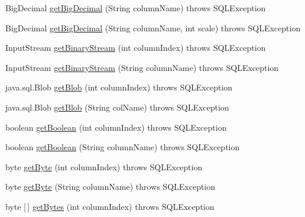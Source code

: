 \begin{DoxyCompactItemize}
\item 
Big\+Decimal \mbox{\hyperlink{classcom_1_1mysql_1_1cj_1_1jdbc_1_1result_1_1_result_set_impl_a046a2a4a9b467347eb74d6f22570672a}{get\+Big\+Decimal}} (String column\+Name)  throws S\+Q\+L\+Exception 
\item 
Big\+Decimal \mbox{\hyperlink{classcom_1_1mysql_1_1cj_1_1jdbc_1_1result_1_1_result_set_impl_aa3efee2955eda3fcaf80857db8f49807}{get\+Big\+Decimal}} (String column\+Name, int scale)  throws S\+Q\+L\+Exception 
\item 
Input\+Stream \mbox{\hyperlink{classcom_1_1mysql_1_1cj_1_1jdbc_1_1result_1_1_result_set_impl_a06c0080b1cef002f50342fd6e37c57a9}{get\+Binary\+Stream}} (int column\+Index)  throws S\+Q\+L\+Exception 
\item 
Input\+Stream \mbox{\hyperlink{classcom_1_1mysql_1_1cj_1_1jdbc_1_1result_1_1_result_set_impl_a43413f20e313d37531c3b21315720eaf}{get\+Binary\+Stream}} (String column\+Name)  throws S\+Q\+L\+Exception 
\item 
java.\+sql.\+Blob \mbox{\hyperlink{classcom_1_1mysql_1_1cj_1_1jdbc_1_1result_1_1_result_set_impl_a0b4c399841f795d27a558f449d63400a}{get\+Blob}} (int column\+Index)  throws S\+Q\+L\+Exception 
\item 
java.\+sql.\+Blob \mbox{\hyperlink{classcom_1_1mysql_1_1cj_1_1jdbc_1_1result_1_1_result_set_impl_acb041a26eb0e7c998979cfdc6c13c9d7}{get\+Blob}} (String col\+Name)  throws S\+Q\+L\+Exception 
\item 
boolean \mbox{\hyperlink{classcom_1_1mysql_1_1cj_1_1jdbc_1_1result_1_1_result_set_impl_a7ff2d08a3f6940ee6580502e197e4d2e}{get\+Boolean}} (int column\+Index)  throws S\+Q\+L\+Exception 
\item 
boolean \mbox{\hyperlink{classcom_1_1mysql_1_1cj_1_1jdbc_1_1result_1_1_result_set_impl_ab783c68052a3e7b6aeec429923cc038f}{get\+Boolean}} (String column\+Name)  throws S\+Q\+L\+Exception 
\item 
byte \mbox{\hyperlink{classcom_1_1mysql_1_1cj_1_1jdbc_1_1result_1_1_result_set_impl_ade04804d94fd16c8b083e0961540923d}{get\+Byte}} (int column\+Index)  throws S\+Q\+L\+Exception 
\item 
byte \mbox{\hyperlink{classcom_1_1mysql_1_1cj_1_1jdbc_1_1result_1_1_result_set_impl_aa1836de44060d6b1a51a7faeb85ecc2b}{get\+Byte}} (String column\+Name)  throws S\+Q\+L\+Exception 
\item 
byte \mbox{[}$\,$\mbox{]} \mbox{\hyperlink{classcom_1_1mysql_1_1cj_1_1jdbc_1_1result_1_1_result_set_impl_a2ef6004e11b94cedd1931f45d1943705}{get\+Bytes}} (int column\+Index)  throws S\+Q\+L\+Exception 

\end{DoxyCompactItemize}

